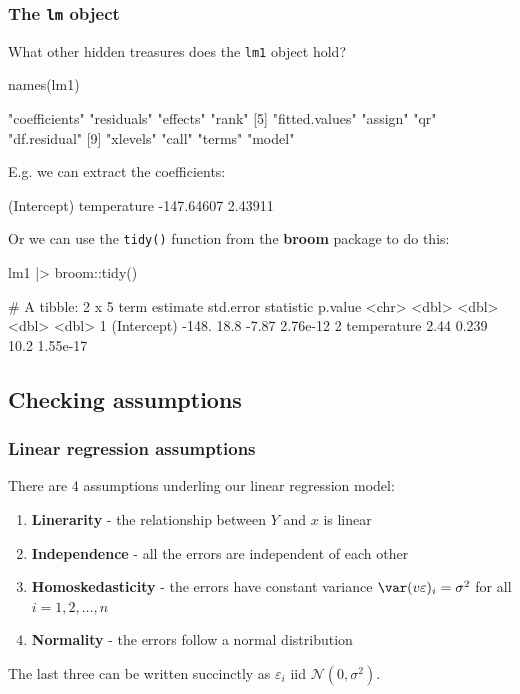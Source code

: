 \documentclass[a4paper]{article}\usepackage[]{graphicx}\usepackage[]{xcolor}
\begin{document}
\subsubsection{The \textcolor{myblue}{\lstinline|lm|} object}
What other hidden treasures does the \lstinline|lm1| object hold?
\begin{Schunk}
\begin{Sinput}
names(lm1)
\end{Sinput}
\begin{Soutput}
 [1] "coefficients"  "residuals"     "effects"       "rank"         
 [5] "fitted.values" "assign"        "qr"            "df.residual"  
 [9] "xlevels"       "call"          "terms"         "model"        
\end{Soutput}
\end{Schunk}
E.g. we can extract the coefficients:
\begin{Schunk}
\begin{Soutput}
(Intercept) temperature 
 -147.64607     2.43911 
\end{Soutput}
\end{Schunk}
Or we can use the \lstinline|tidy()| function from the \textbf{broom} package to do this:
\begin{Schunk}
\begin{Sinput}
lm1 |> broom::tidy()
\end{Sinput}
\begin{Soutput}
# A tibble: 2 x 5
  term        estimate std.error statistic  p.value
  <chr>          <dbl>     <dbl>     <dbl>    <dbl>
1 (Intercept)  -148.      18.8       -7.87 2.76e-12
2 temperature     2.44     0.239     10.2  1.55e-17
\end{Soutput}
\end{Schunk}
\subsection{Checking assumptions}
\subsubsection{Linear regression assumptions}
There are 4 assumptions underling our linear regression model:
\begin{enumerate}
	\item \textbf{Linerarity} - the relationship between \( Y \) and \( x \) is linear
	\item \textbf{Independence} -  all the errors are independent of each other
	\item \textbf{Homoskedasticity} - the errors have constant variance \( \var (v\varepsilon)_i = \sigma^2 \) for all \( i = 1,2, \dotsc, n \)
	\item \textbf{Normality} - the errors follow a normal distribution
\end{enumerate}
The last three can be written succinctly as \( \varepsilon_i \) iid \( \mathcal{N} (0,\sigma^2) \).
\end{document}
